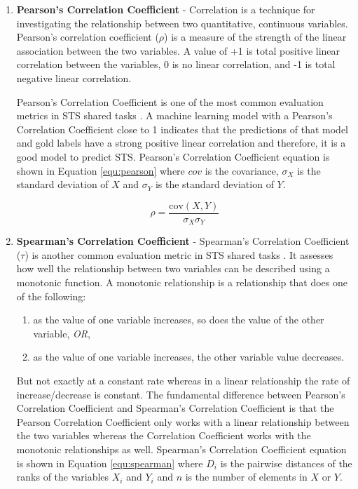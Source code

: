 \begin{enumerate}
	
	\item \textbf{Pearson's Correlation Coefficient} - Correlation is a technique for investigating the relationship between two quantitative, continuous variables. Pearson's correlation coefficient ($\rho$)  is a measure of the strength of the linear association between the two variables. A value of +1 is total positive linear correlation between the variables, 0 is no linear correlation, and -1 is total negative linear correlation. 
	
	Pearson's Correlation Coefficient is one of the most common evaluation metrics in STS shared tasks \cite{marelli-etal-2014-semeval,agirre-etal-2012-semeval,agirre-etal-2013-sem,agirre-etal-2014-semeval,agirre-etal-2015-semeval,agirre-etal-2016-semeval}. A machine learning model with a Pearson's Correlation Coefficient close to 1 indicates that the predictions of that model and gold labels have a strong positive linear correlation and therefore, it is a good model to predict STS. Pearson's Correlation Coefficient equation is shown in Equation \ref{equ:pearson} where $cov$  is the covariance, $\sigma_X$ is the standard deviation of $X$ and $\sigma_Y$ is the standard deviation of $Y$.
	
	\begin{equation}
	\label{equ:pearson}
	\rho = \frac{\text{cov}(X,Y)}{\sigma_X \sigma_Y}
	\end{equation}
	
	\item \textbf{Spearman's Correlation Coefficient} - Spearman's Correlation Coefficient ($\tau$) is another common evaluation metric in STS shared tasks \cite{marelli-etal-2014-semeval,agirre-etal-2012-semeval,agirre-etal-2013-sem,agirre-etal-2014-semeval,agirre-etal-2015-semeval,agirre-etal-2016-semeval}. It assesses how well the relationship between two variables can be described using a monotonic function. A monotonic relationship is a relationship that does one of the following: 
	
	\begin{enumerate}
		\item as the value of one variable increases, so does the value of the other variable, \textit{OR},
		\item as the value of one variable increases, the other variable value decreases.
	\end{enumerate}
	
	But not exactly at a constant rate whereas in a linear relationship the rate of increase/decrease is constant. The fundamental difference between Pearson's Correlation Coefficient and Spearman's Correlation Coefficient is that the Pearson Correlation Coefficient only works with a linear relationship between the two variables whereas the Correlation Coefficient works with the monotonic relationships as well. Spearman's Correlation Coefficient equation is shown in Equation \ref{equ:spearman} where $D_i$ is the pairwise distances of the ranks of the variables $X_i$ and $Y_i$ and $n$ is the number of elements in $X$ or $Y$.  
	

\end{enumerate}
